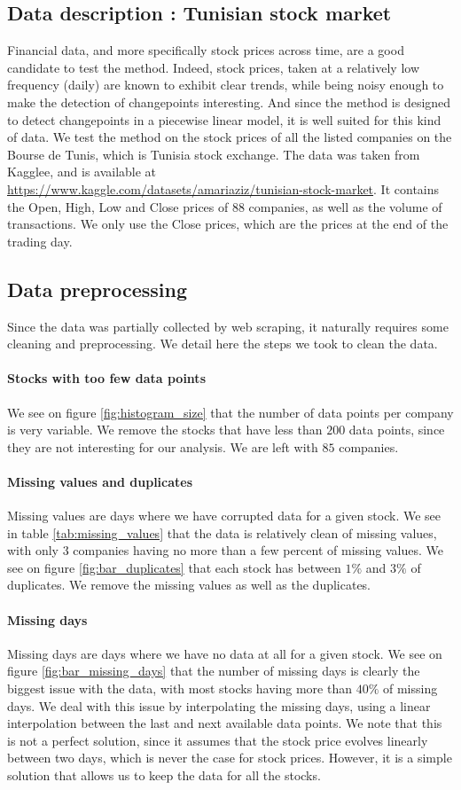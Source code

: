 \documentclass[11pt]{article}
\begin{document}
\subsection{Data description : Tunisian stock market}
Financial data, and more specifically stock prices across time, are a good candidate to test the method. Indeed, stock prices, taken at a relatively low frequency (daily) are known to exhibit clear trends, while being noisy enough to make the detection of changepoints interesting. And since the method is designed to detect changepoints in a piecewise linear model, it is well suited for this kind of data.
\jump
We test the method on the stock prices of all the listed companies on the Bourse de Tunis, which is Tunisia stock exchange. The data was taken from Kagglee, and is available at \url{https://www.kaggle.com/datasets/amariaziz/tunisian-stock-market}. It contains the Open, High, Low and Close prices of 88 companies, as well as the volume of transactions. We only use the Close prices, which are the prices at the end of the trading day.
\subsection{Data preprocessing}
Since the data was partially collected by web scraping, it naturally requires some cleaning and preprocessing. We detail here the steps we took to clean the data.
\paragraph*{Stocks with too few data points} We see on figure \ref{fig:histogram_size} that the number of data points per company is very variable. We remove the stocks that have less than $200$ data points, since they are not interesting for our analysis. We are left with $85$ companies.
\paragraph*{Missing values and duplicates} Missing values are days where we have corrupted data for a given stock. We see in table \ref{tab:missing_values} that the data is relatively clean of missing values, with only $3$ companies having no more than a few percent of missing values. We see on figure \ref{fig:bar_duplicates} that each stock has between $1\%$ and $3\%$ of duplicates. We remove the missing values as well as the duplicates.
\paragraph*{Missing days} Missing days are days where we have no data at all for a given stock. We see on figure \ref{fig:bar_missing_days} that the number of missing days is clearly the biggest issue with the data, with most stocks having more than $40\%$ of missing days. We deal with this issue by interpolating the missing days, using a linear interpolation between the last and next available data points. We note that this is not a perfect solution, since it assumes that the stock price evolves linearly between two days, which is never the case for stock prices. However, it is a simple solution that allows us to keep the data for all the stocks.
\end{document}
